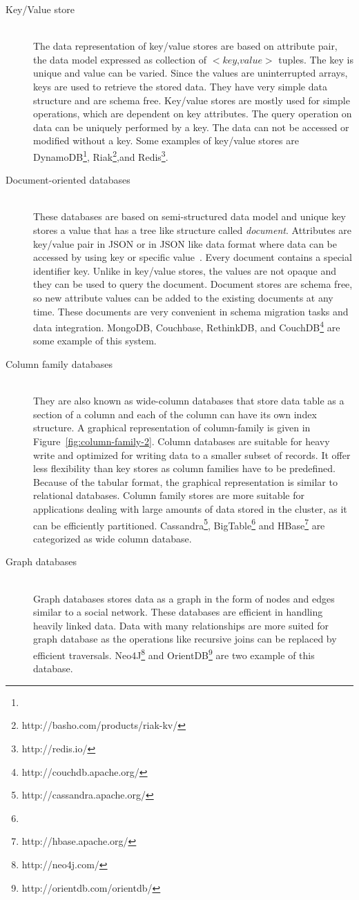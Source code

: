 	\begin{description}
		\item[Key/Value store] \hfill \\ 
		The data representation of key/value stores are based on attribute pair, the data model expressed as collection of $<$$key$,$value$$>$ tuples. The key is unique and value can be varied. Since the values are uninterrupted arrays, keys are used to retrieve the stored data. They have very simple data structure and are schema free. Key/value stores are mostly used for simple operations, which are dependent on key attributes. The query operation on data can be uniquely performed by a key. The data can not be accessed or modified without a key. Some examples of key/value stores are DynamoDB\footnote{}, Riak\footnote{http://basho.com/products/riak-kv/},and Redis\footnote{http://redis.io/}.
		\item[Document-oriented databases] \hfill \\ 
	These databases	are based on semi-structured data model and unique key stores a value that has a tree like structure called \textit{document}. Attributes are key/value pair in JSON or in JSON like data format where data can be accessed by using key or specific value~\citep{hecht2011nosql}. Every document contains a special identifier key. Unlike in key/value stores, the values are not opaque and  they can be used to query the document. Document stores are schema free, so new attribute values can be added to the existing documents at any time. These documents are very convenient in schema migration tasks and data integration.  MongoDB, Couchbase, RethinkDB, and CouchDB\footnote{http://couchdb.apache.org/} are some example of this system.
		\item [Column family databases] \hfill \\
		They are also known as wide-column databases that store data table as a section of a column and each of the column can have  its own index structure. A graphical representation of column-family is given in  Figure~\ref{fig:column-family-2}. Column databases are suitable for heavy write and optimized for writing data to a smaller subset of records. It offer less flexibility than key stores as column families have to be predefined. Because of the tabular format, the graphical representation is similar to relational databases. Column family stores are more suitable for applications dealing with large amounts of data stored in the cluster, as it can be efficiently partitioned.  Cassandra\footnote{http://cassandra.apache.org/}, BigTable\footnote{} and HBase\footnote{http://hbase.apache.org/} are categorized as wide column database.
		\item[Graph databases] \hfill \\
		Graph databases stores data as a  graph in the form of nodes and edges similar to a social network. These databases are efficient in handling heavily linked data. Data with many relationships are more suited for graph database as the operations like recursive joins can be replaced by efficient traversals. Neo4J\footnote{http://neo4j.com/} and OrientDB\footnote{http://orientdb.com/orientdb/} are two example of this database.

\end{description}
	
